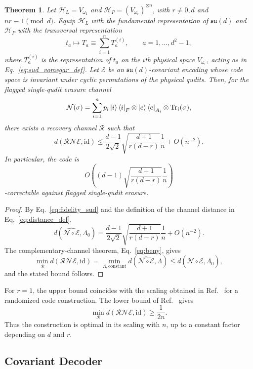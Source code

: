 \documentclass[10pt,twocolumn,superscriptaddress,aps,amsmath,amssymb,citeautoscript,floatfix,prx]{revtex4-2}
\newtheorem{theorem}{Theorem}
\theoremstyle{plain}
\theoremstyle{plain}
\theoremstyle{plain}
\theoremstyle{plain}
\theoremstyle{plain}
\theoremstyle{plain}
\begin{document}
\begin{theorem}\label{thrm:sudscale}
Let $\mathcal H_L=V_{\omega_1}$ and $\mathcal H_P=(V_{\omega_r})^{\otimes n}$, with $r\neq 0,d$ and $nr\equiv 1\pmod d$. Equip $\mathcal H_L$ with the fundamental representation of $\mathfrak{su}(d)$ and $\mathcal H_P$ with the transversal representation
\begin{equation}
t_a
\longmapsto
T_a
\equiv
\sum_{i=1}^n T_a^{(i)},
\qquad
a=1,\ldots,d^2-1,
\end{equation}
where $T_a^{(i)}$ is the representation of $t_a$ on the $i$th physical space $V_{\omega_r}$, acting as in Eq.~\eqref{eq:sud_vomegar_def}. Let $\mathcal E$ be an $\mathfrak{su}(d)$-covariant encoding whose code space is invariant under cyclic permutations of the physical qudits. Then, for the flagged single-qudit erasure channel
$$
\mathcal N(\sigma)
=
\sum_{i=1}^n
p_i\ket i\bra i_F
\otimes
\ket e\bra e_{A_i}
\otimes
\operatorname{Tr}_i(\sigma),
$$
there exists a recovery channel $\mathcal R$ such that
$$
d(\mathcal R\mathcal N\mathcal E,\mathrm{id})
\le
\frac{d-1}{2\sqrt 2}
\sqrt{\frac{d+1}{r(d-r)}}
\frac1n
+
O(n^{-2}) .
$$
In particular, the code is
$$
O\left(
(d-1)
\sqrt{\frac{d+1}{r(d-r)}}
\frac1n
\right)
$$
-correctable against flagged single-qudit erasure.
\end{theorem}

\begin{proof}
By Eq.~\eqref{eq:fidelity_sud} and the definition of the channel distance in Eq.~\eqref{eq:distance_def},
$$
d\left(\widehat{\mathcal N\circ\mathcal E},\Lambda_0\right)
=
\frac{d-1}{2\sqrt 2}
\sqrt{\frac{d+1}{r(d-r)}}
\frac1n
+
O(n^{-2}) .
$$
The complementary-channel theorem, Eq.~\eqref{eq:beny}, gives
$$
\min_{\mathcal R}
d(\mathcal R\mathcal N\mathcal E,\mathrm{id})
=
\min_{\Lambda,\mathrm{constant}}
d\left(\widehat{\mathcal N\circ\mathcal E},\Lambda\right)
\le
d\left(\widehat{\mathcal N\circ\mathcal E},\Lambda_0\right),
$$
and the stated bound follows.
\end{proof}

For $r=1$, the upper bound coincides with the scaling obtained in Ref.~\cite{Kong2022} for a randomized code construction. The lower bound of Ref.~\cite{Faist2020} gives
$$
\min_{\mathcal R}
d(\mathcal R\mathcal N\mathcal E,\mathrm{id})
\ge
\frac{1}{2n}.
$$
Thus the construction is optimal in its scaling with $n$, up to a constant factor depending on $d$ and $r$.

\subsection{Covariant Decoder}\label{subsec:main_decoder}
\end{document}
